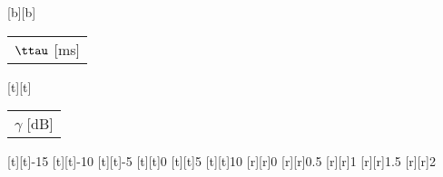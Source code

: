 %    
%
%
%
[b][b]{\fontsize{9}{13.5}\selectfont \color[rgb]{0,0,0}\setlength{\tabcolsep}{0pt}\begin{tabular}{c}$\ttau$ [ms]\end{tabular}}%
[t][t]{\fontsize{9}{13.5}\selectfont \color[rgb]{0,0,0}\setlength{\tabcolsep}{0pt}\begin{tabular}{c}$\gamma$ [dB]\end{tabular}}%
%
\fontsize{9}{13.5}%
\selectfont%
%
[t][t]{-15}%
[t][t]{-10}%
[t][t]{-5}%
[t][t]{0}%
[t][t]{5}%
[t][t]{10}%
%
[r][r]{0}%
[r][r]{0.5}%
[r][r]{1}%
[r][r]{1.5}%
[r][r]{2}%
%
%
